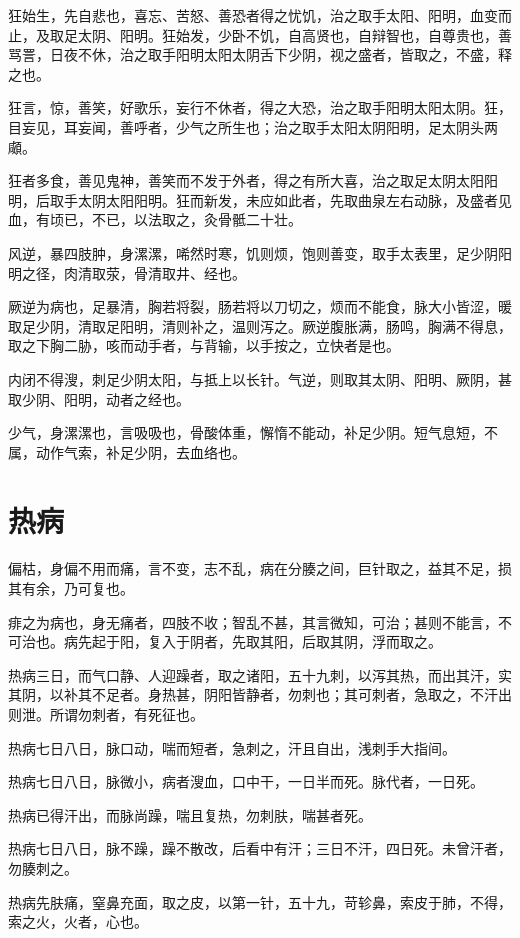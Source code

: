 \documentclass[a4paper,12pt,UTF8,twoside]{ctexbook}
\begin{document}
	狂始生，先自悲也，喜忘、苦怒、善恐者得之忧饥，治之取手太阳、阳明，血变而止，及取足太阴、阳明。狂始发，少卧不饥，自高贤也，自辩智也，自尊贵也，善骂詈，日夜不休，治之取手阳明太阳太阴舌下少阴，视之盛者，皆取之，不盛，释之也。
	
	狂言，惊，善笑，好歌乐，妄行不休者，得之大恐，治之取手阳明太阳太阴。狂，目妄见，耳妄闻，善呼者，少气之所生也；治之取手太阳太阴阳明，足太阴头两顑。
	
	狂者多食，善见鬼神，善笑而不发于外者，得之有所大喜，治之取足太阴太阳阳明，后取手太阴太阳阳明。狂而新发，未应如此者，先取曲泉左右动脉，及盛者见血，有顷已，不已，以法取之，灸骨骶二十壮。
	
	风逆，暴四肢肿，身漯漯，唏然时寒，饥则烦，饱则善变，取手太表里，足少阴阳明之径，肉清取荥，骨清取井、经也。
	
	厥逆为病也，足暴清，胸若将裂，肠若将以刀切之，烦而不能食，脉大小皆涩，暖取足少阴，清取足阳明，清则补之，温则泻之。厥逆腹胀满，肠鸣，胸满不得息，取之下胸二胁，咳而动手者，与背输，以手按之，立快者是也。
	
	内闭不得溲，刺足少阴太阳，与抵上以长针。气逆，则取其太阴、阳明、厥阴，甚取少阴、阳明，动者之经也。
	
	少气，身漯漯也，言吸吸也，骨酸体重，懈惰不能动，补足少阴。短气息短，不属，动作气索，补足少阴，去血络也。
	\chapter{热病}
	
	偏枯，身偏不用而痛，言不变，志不乱，病在分腠之间，巨针取之，益其不足，损其有余，乃可复也。
	
	痱之为病也，身无痛者，四肢不收；智乱不甚，其言微知，可治；甚则不能言，不可治也。病先起于阳，复入于阴者，先取其阳，后取其阴，浮而取之。
	
	热病三日，而气口静、人迎躁者，取之诸阳，五十九刺，以泻其热，而出其汗，实其阴，以补其不足者。身热甚，阴阳皆静者，勿刺也；其可刺者，急取之，不汗出则泄。所谓勿刺者，有死征也。
	
	热病七日八日，脉口动，喘而短者，急刺之，汗且自出，浅刺手大指间。
	
	热病七日八日，脉微小，病者溲血，口中干，一日半而死。脉代者，一日死。
	
	热病已得汗出，而脉尚躁，喘且复热，勿刺肤，喘甚者死。
	
	热病七日八日，脉不躁，躁不散改，后看中有汗；三日不汗，四日死。未曾汗者，勿腠刺之。
	
	热病先肤痛，窒鼻充面，取之皮，以第一针，五十九，苛轸鼻，索皮于肺，不得，索之火，火者，心也。
	
\end{document}
